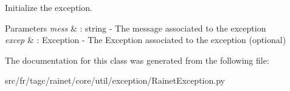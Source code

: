 Initialize the exception. 


\begin{DoxyParams}{Parameters}
{\em mess} & \+: string -\/ The message associated to the exception \\
\hline
{\em excep} & \+: Exception -\/ The Exception associated to the exception (optional) \\
\hline
\end{DoxyParams}


The documentation for this class was generated from the following file\+:\begin{DoxyCompactItemize}
\item 
src/fr/tagc/rainet/core/util/exception/Rainet\+Exception.\+py\end{DoxyCompactItemize}
